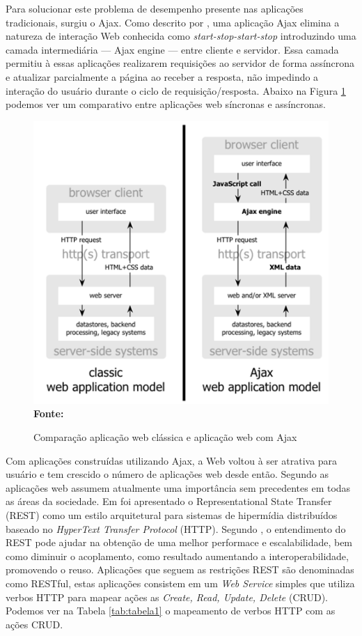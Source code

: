 Para solucionar este problema de desempenho presente nas aplicações tradicionais, surgiu o Ajax. Como descrito por \cite{garrettAjax}, uma aplicação
Ajax elimina a natureza de interação Web conhecida como \textit{start-stop-start-stop} introduzindo uma camada intermediária — Ajax engine — entre 
cliente e servidor. Essa camada permitiu à essas aplicações realizarem requisições ao servidor de forma assíncrona e atualizar parcialmente a 
página ao receber a resposta, não impedindo a interação do usuário durante o ciclo de requisição/resposta. Abaixo na Figura \ref{fig:ajax_comparison} 
podemos ver um comparativo entre aplicações web síncronas e assíncronas.

\begin{figure}[!ht]
	\centering	
	\caption[\hspace{0.1cm}Comparação aplicação web clássica e aplicação web com Ajax.]{Comparação aplicação web clássica e aplicação web com Ajax}
	  \vspace{-0.4cm}
	\includegraphics[width=.8\textwidth]{figuras/ajax_comparison.png}
	 \vspace{-0.3cm}
	\\\textbf{\footnotesize Fonte: \cite{garrettAjax}}
	\label{fig:ajax_comparison}
\end{figure}


Com aplicações construídas utilizando Ajax, a Web voltou à ser atrativa para usuário e tem crescido o número de aplicações web desde então. Segundo
\cite{tabulaRest} as aplicações web assumem atualmente uma importância sem precedentes em todas as áreas da sociedade. Em \cite{fieldingRest} foi apresentado o Representational State Transfer (REST) 
como um estilo arquitetural para sistemas de hipermídia distribuídos baseado no \textit{HyperText Transfer Protocol} (HTTP). Segundo 
\cite{modelingRestful}, o entendimento do REST pode ajudar na obtenção de uma melhor performace e escalabilidade, bem como diminuir o acoplamento,
como resultado aumentando a interoperabilidade, promovendo o reuso. Aplicações que seguem as restrições REST são denominadas como RESTful, estas 
aplicações consistem em um \textit{Web Service} simples que utiliza verbos HTTP para mapear ações as \textit{Create, Read, Update, Delete} (CRUD). 
Podemos ver na Tabela \ref{tab:tabela1} o mapeamento de verbos HTTP com as ações CRUD.

